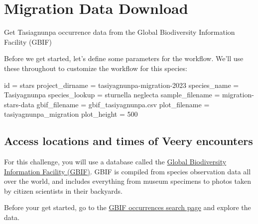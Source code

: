 \documentclass[
  letterpaper,
  DIV=11,
  numbers=noendperiod,
  oneside]{scrreprt}
\newenvironment{Shaded}{\begin{snugshade}}{\end{snugshade}}
\newcommand{\BuiltInTok}[1]{\textcolor[rgb]{0.00,0.23,0.31}{#1}}
\newcommand{\DecValTok}[1]{\textcolor[rgb]{0.68,0.00,0.00}{#1}}
\newcommand{\NormalTok}[1]{\textcolor[rgb]{0.00,0.23,0.31}{#1}}
\newcommand{\OperatorTok}[1]{\textcolor[rgb]{0.37,0.37,0.37}{#1}}
\newcommand{\StringTok}[1]{\textcolor[rgb]{0.13,0.47,0.30}{#1}}
\begin{document}

\chapter{Migration Data Download}\label{migration-data-download}

Get Tasiagnunpa occurrence data from the Global Biodiversity Information
Facility (GBIF)

\hfill\break

Before we get started, let's define some parameters for the workflow.
We'll use these throughout to customize the workflow for this species:

\begin{Shaded}
\begin{Highlighting}[]
\BuiltInTok{id} \OperatorTok{=} \StringTok{\textquotesingle{}stars\textquotesingle{}}
\NormalTok{project\_dirname }\OperatorTok{=} \StringTok{\textquotesingle{}tasiyagnunpa{-}migration{-}2023\textquotesingle{}}
\NormalTok{species\_name }\OperatorTok{=} \StringTok{\textquotesingle{}Tasiyagnunpa\textquotesingle{}}
\NormalTok{species\_lookup }\OperatorTok{=} \StringTok{\textquotesingle{}sturnella neglecta\textquotesingle{}}
\NormalTok{sample\_filename }\OperatorTok{=} \StringTok{\textquotesingle{}migration{-}stars{-}data\textquotesingle{}}
\NormalTok{gbif\_filename }\OperatorTok{=} \StringTok{\textquotesingle{}gbif\_tasiyagnunpa.csv\textquotesingle{}}
\NormalTok{plot\_filename }\OperatorTok{=} \StringTok{\textquotesingle{}tasiyagnunpa\_migration\textquotesingle{}}
\NormalTok{plot\_height }\OperatorTok{=} \DecValTok{500}
\end{Highlighting}
\end{Shaded}

\section{Access locations and times of Veery
encounters}\label{access-locations-and-times-of-veery-encounters}

For this challenge, you will use a database called the
\href{https://www.gbif.org/}{Global Biodiversity Information Facility
(GBIF)}. GBIF is compiled from species observation data all over the
world, and includes everything from museum specimens to photos taken by
citizen scientists in their backyards.

\begin{tcolorbox}[enhanced jigsaw, colbacktitle=quarto-callout-color!10!white, opacityback=0, bottomtitle=1mm, toptitle=1mm, bottomrule=.15mm, left=2mm, colframe=quarto-callout-color-frame, leftrule=.75mm, opacitybacktitle=0.6, colback=white, rightrule=.15mm, toprule=.15mm, breakable, titlerule=0mm, title=\textcolor{quarto-callout-color}{\faInfo}\hspace{0.5em}{Try It: Explore GBIF}, coltitle=black, arc=.35mm]

Before your get started, go to the
\href{https://www.gbif.org/occurrence/search}{GBIF occurrences search
page} and explore the data.

\end{tcolorbox}
\end{document}
